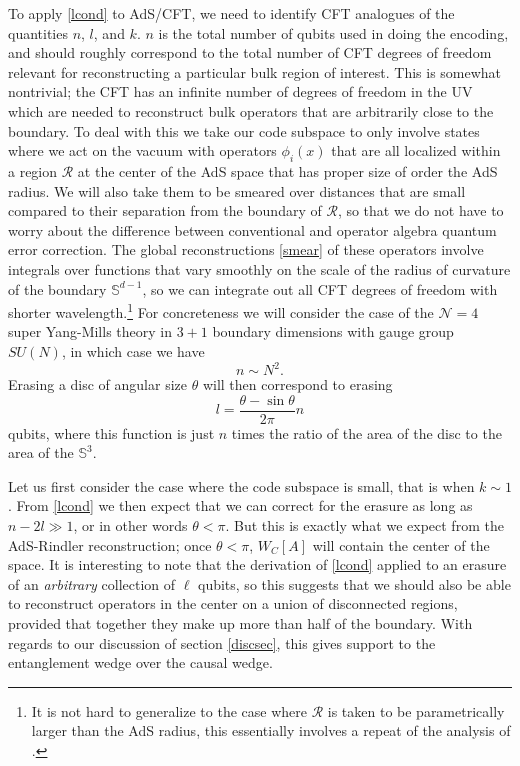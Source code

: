 \documentclass[11pt]{article}
\newcommand{\be}{\begin{equation}}
\newcommand{\ee}{\end{equation}}
\begin{document}
To apply \eqref{lcond} to AdS/CFT, we need to identify CFT analogues of the quantities $n$, $l$, and $k$.  $n$ is the total number of qubits used in doing the encoding, and should roughly correspond to the total number of CFT degrees of freedom relevant for reconstructing a particular bulk region of interest.  This is somewhat nontrivial; the CFT has an infinite number of degrees of freedom in the UV which are needed to reconstruct bulk operators that are arbitrarily close to the boundary.  To deal with this we take our code subspace to only involve states where we act on the vacuum with operators $\phi_i(x)$ that are all localized within a region $\mathcal{R}$ at the center of the AdS space that has proper size of order the AdS radius.  We will also take them to be smeared over distances that are small compared to their separation from the boundary of $\mathcal{R}$, so that we do not have to worry about the difference between conventional and operator algebra quantum error correction.  The global reconstructions \eqref{smear} of these operators involve integrals over functions that vary smoothly on the scale of the radius of curvature of the boundary $\mathbb{S}^{d-1}$, so we can integrate out all CFT degrees of freedom with shorter wavelength.\footnote{It is not hard to generalize to the case where $\mathcal{R}$ is taken to be parametrically larger than the AdS radius, this essentially involves a repeat of the analysis of \cite{Susskind:1998dq}.}  For concreteness we will consider the case of the $\mathcal{N}=4$ super Yang-Mills theory in $3+1$ boundary dimensions with gauge group $SU(N)$, in which case we have
\be
n\sim N^2.
\ee
Erasing a disc of angular size $\theta$ will then correspond to erasing 
\be
l=\frac{\theta- \sin \theta}{2\pi} n
\ee
qubits, where this function is just $n$ times the ratio of the area of the disc to the area of the $\mathbb{S}^3$.    

Let us first consider the case where the code subspace is small, that is when $k\sim 1$.  From \eqref{lcond} we then expect that we can correct for the erasure as long as $n-2l \gg 1$, or in other words $\theta<\pi$.  But this is exactly what we expect from the AdS-Rindler reconstruction; once $\theta<\pi$, $W_C[A]$ will contain the center of the space.  It is interesting to note that the derivation of \eqref{lcond} applied to an erasure of an \textit{arbitrary} collection of $\ell$ qubits, so this suggests that we should also be able to reconstruct operators in the center on a union of disconnected regions, provided that together they make up more than half of the boundary.  With regards to our discussion of section \ref{discsec}, this gives support to the entanglement wedge over the causal wedge.
\end{document}
